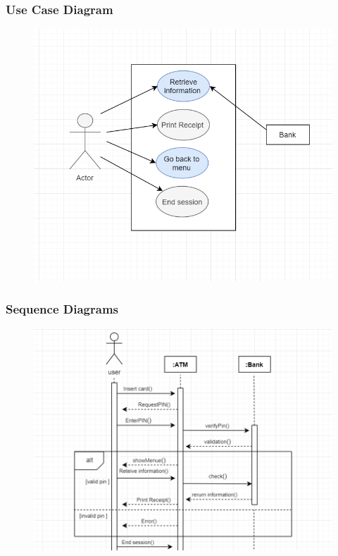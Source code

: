 \documentclass{article}
\begin{document}
		\newpage\subsubsection{Use Case Diagram}
			\begin{figure}[h!]
			  \includegraphics[width=\linewidth]{img/inquiry_usecase.png}
			\end{figure}

		\newpage\subsubsection{Sequence Diagrams}
		\begin{figure}[h!]
		  \includegraphics[width=\linewidth]{img/inquiry_sequence.png}
		\end{figure}
\end{document}
